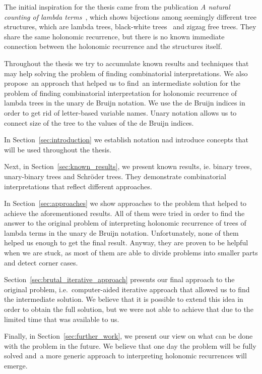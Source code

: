 \documentclass[final]{article}
\theoremstyle{definition}
\theoremstyle{definition}
\theoremstyle{remark}
\begin{document}
The initial inspiration for the thesis came from the publication \textit{A natural counting of lambda terms}~\cite{inspiration}, which shows bijections among seemingly different tree structures, which are lambda trees, black-white trees~\cite{blackwhite} and zigzag free trees. They share the same holonomic recurrence, but there is no known immediate connection between the holonomic recurrence and the structures itself.

Throughout the thesis we try to accumulate known results and techniques that may help solving the problem of finding combinatorial interpretations. We also propose~an approach that helped us to find~an intermediate solution for the problem of finding combinatorial interpretation for holonomic recurrence of lambda trees in the unary de Bruijn notation. We use the de Bruijn indices in order to get rid of letter-based variable names. Unary notation allows us to connect size of the tree to the values of the de Bruijn indices.

In Section~\ref{sec:introduction} we establish notation nad introduce concepts that will be used throughout the thesis.

Next, in Section~\ref{sec:known_results}, we present known results, ie. binary trees, unary-binary trees and Schröder trees. They demonstrate combinatorial interpretations that reflect different approaches.

In Section~\ref{sec:approaches} we show approaches to the problem that helped to achieve the aforementioned results. All of them were tried in order to find the answer to the original problem of interpreting holonomic recurrence of trees of lambda terms in the unary de Bruijn notation. Unfortunately, none of them helped us enough to get the final result. Anyway, they are proven to be helpful when we are stuck, as most of them are able to divide problems into smaller parts and detect corner cases.

Section~\ref{sec:brutal_iterative_approach} presents our final approach to the original problem, i.e.~computer-aided iterative approach that allowed us to find the intermediate solution. We believe that it is possible to extend this idea in order to obtain the full solution, but we were not able to achieve that due to the limited time that was available to us.

Finally, in Section~\ref{sec:further_work}, we present our view on what can be done with the problem in the future. We believe that one day the problem will be fully solved and~a more generic approach to interpreting holonomic recurrences will emerge.
\end{document}
